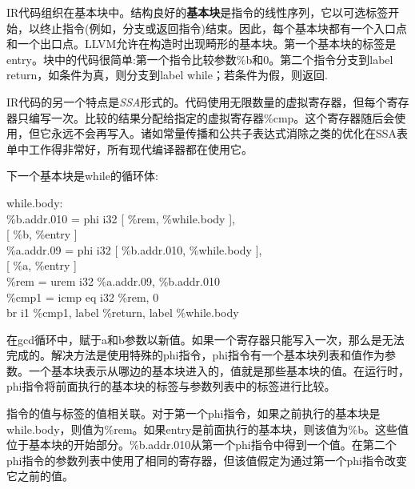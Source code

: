 IR代码组织在基本块中。结构良好的\textbf{基本块}是指令的线性序列，它以可选标签开始，以终止指令(例如，分支或返回指令)结束。因此，每个基本块都有一个入口点和一个出口点。LLVM允许在构造时出现畸形的基本块。第一个基本块的标签是entry。块中的代码很简单:第一个指令比较参数\%b和0。第二个指令分支到label return，如条件为真，则分支到label while；若条件为假，则返回.\par

IR代码的另一个特点是\textit{SSA}形式的。代码使用无限数量的虚拟寄存器，但每个寄存器只编写一次。比较的结果分配给指定的虚拟寄存器\%cmp。这个寄存器随后会使用，但它永远不会再写入。诸如常量传播和公共子表达式消除之类的优化在SSA表单中工作得非常好，所有现代编译器都在使用它。\par

下一个基本块是while的循环体:\par

\begin{tcolorbox}[colback=white,colframe=black]
while.body: \\
\hspace*{0.5cm}\%b.addr.010 = phi i32 [ \%rem, \%while.body ], \\
\hspace*{3.5cm}[ \%b, \%entry ] \\
\hspace*{0.5cm}\%a.addr.09 = phi i32 [ \%b.addr.010, \%while.body ], \\
\hspace*{3.5cm}[ \%a, \%entry ] \\
\hspace*{0.5cm}\%rem = urem i32 \%a.addr.09, \%b.addr.010 \\
\hspace*{0.5cm}\%cmp1 = icmp eq i32 \%rem, 0 \\
\hspace*{0.5cm}br i1 \%cmp1, label \%return, label \%while.body
\end{tcolorbox}

在gcd循环中，赋于a和b参数以新值。如果一个寄存器只能写入一次，那么是无法完成的。解决方法是使用特殊的phi指令，phi指令有一个基本块列表和值作为参数。一个基本块表示从哪边的基本块进入的，值就是那些基本块的值。在运行时，phi指令将前面执行的基本块的标签与参数列表中的标签进行比较。\par

指令的值与标签的值相关联。对于第一个phi指令，如果之前执行的基本块是while.body，则值为\%rem。如果entry是前面执行的基本块，则该值为\%b。这些值位于基本块的开始部分。\%b.addr.010从第一个phi指令中得到一个值。在第二个phi指令的参数列表中使用了相同的寄存器，但该值假定为通过第一个phi指令改变它之前的值。\par

